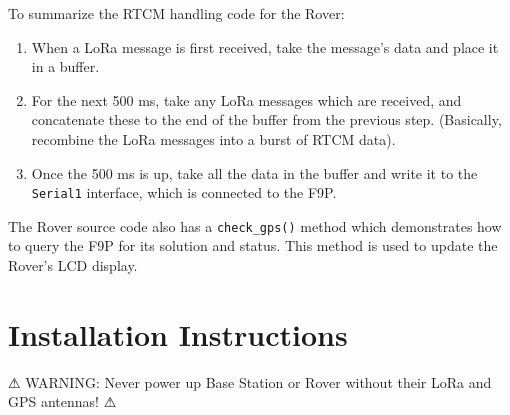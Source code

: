 \documentclass{article}%
\begin{document}
To summarize the RTCM handling code for the Rover:
\begin{enumerate}
	\item When a LoRa message is first received, take the message's data and place it in a buffer.
	\item For the next 500 ms, take any LoRa messages which are received, and concatenate these to the end of the buffer from the previous step.  (Basically, recombine the LoRa messages into a burst of RTCM data).
	\item Once the 500 ms is up, take all the data in the buffer and write it to the \texttt{Serial1} interface, which is connected to the F9P.
\end{enumerate}
\begin{myquote}
The Rover source code also has a \texttt{check\_gps()} method which demonstrates how to query the F9P for its solution and status.  This method is used to update the Rover's LCD display.
\end{myquote}

\section{Installation Instructions}
\begin{myquote}
⚠ WARNING: Never power up Base Station or Rover without their LoRa and GPS antennas! ⚠
\end{myquote}
\end{document}
